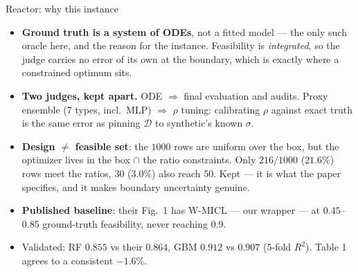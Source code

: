 \documentclass{beamer}
\begin{document}
\begin{frame}{Reactor: why this instance}
  \small
  \begin{itemize}
    \item \textbf{Ground truth is a system of ODEs}, not a fitted model --- the only
      such oracle here, and the reason for the instance. Feasibility is
      \emph{integrated}, so the judge carries no error of its own at the boundary,
      which is exactly where a constrained optimum sits.
    \item \textbf{Two judges, kept apart.} ODE $\Rightarrow$ final evaluation and
      audits. Proxy ensemble (7 types, incl.\ MLP) $\Rightarrow$ $\rho$ tuning:
      calibrating $\rho$ against exact truth is the same error as pinning
      $\mathcal D$ to synthetic's known $\sigma$.
    \item \textbf{Design $\ne$ feasible set}: the $1000$ rows are uniform over the
      box, but the optimizer lives in the box $\cap$ the ratio constraints. Only
      $216/1000$ ($21.6\%$) rows meet the ratios, $30$ ($3.0\%$) also reach $50$.
      Kept --- it is what the paper specifies, and it makes boundary uncertainty
      genuine.
    \item \textbf{Published baseline}: their Fig.~1 has W-MICL --- our wrapper ---
      at $0.45$--$0.85$ ground-truth feasibility, never reaching $0.9$.
    \item Validated: RF $0.855$ vs their $0.864$, GBM $0.912$ vs $0.907$
      (5-fold $R^2$). Table 1 agrees to a consistent $-1.6\%$.
  \end{itemize}
\end{frame}
\end{document}
